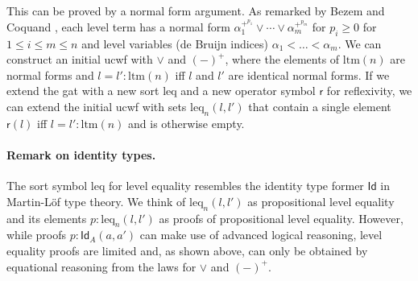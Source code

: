 \documentclass[11pt,a4paper]{article}
\theoremstyle{plain}
\theoremstyle{definition}
\newcommand{\Id}{\mathsf{Id}}
\newcommand{\refl}{\mathsf{r}}
\newcommand{\MB}[1]{{\color{red}{#1}}}
\def\lctx{\mathrm{lctx}}
\def\ltm{\mathrm{ltm}}
\def\leq{\mathrm{leq}}
\begin{document}
This can be proved by a normal form argument. As remarked by Bezem and Coquand \cite{bezem-coquand:lattices},
each level term has a normal form
$
\alpha_1^{+^{p_1}} \vee \cdots \vee \alpha_m^{+^{p_m}}
$
for $p_i \geq 0$ for $1 \le i \le m \le n$ and level variables (de Bruijn indices) $\alpha_1 < \ldots < \alpha_m$.
We can construct an initial ucwf with $\vee$ and $(-)^+$, where the elements of $\ltm(n)$ are normal forms and $l = l' : \ltm(n)$ iff $l$ and $l'$ are identical normal forms.  If we extend the gat with a new sort $\leq$ and a new operator symbol $\refl$ for reflexivity, we can extend the initial ucwf with sets $\leq_n(l,l')$ that contain a single element $\refl(l)$ iff $l = l' : \ltm(n)$ and is otherwise empty.

\paragraph{Remark on identity types.} The sort symbol $\leq$ for level equality resembles the identity type former $\Id$ in Martin-Löf type theory. We think of $\leq_n(l,l')$ as propositional level equality and its elements $p : \leq_n(l,l')$ as proofs of propositional level equality. However, while proofs $p : \Id_A(a,a')$ can make use of advanced logical reasoning, level equality proofs are limited and, as shown above, can only be obtained by equational reasoning from the laws for $\vee$ and $(-)^+$.

%
\end{document}
